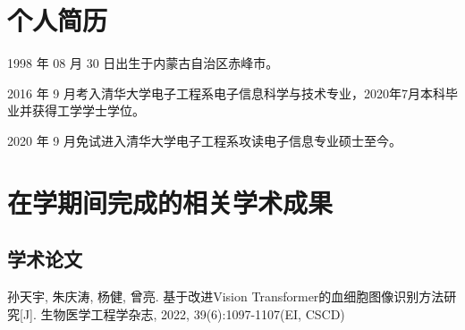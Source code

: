 
\begin{resume}

  \section*{个人简历}

  1998 年 08 月 30 日出生于内蒙古自治区赤峰市。

  2016 年 9 月考入清华大学电子工程系电子信息科学与技术专业，2020年7月本科毕业并获得工学学士学位。

  2020 年 9 月免试进入清华大学电子工程系攻读电子信息专业硕士至今。


  \section*{在学期间完成的相关学术成果}

  \subsection*{学术论文}

  \begin{achievements}
    \item 孙天宇, 朱庆涛, 杨健, 曾亮. 基于改进Vision Transformer的血细胞图像识别方法研究[J]. 生物医学工程学杂志, 2022, 39(6):1097-1107(EI, CSCD)
  \end{achievements}




\end{resume}
